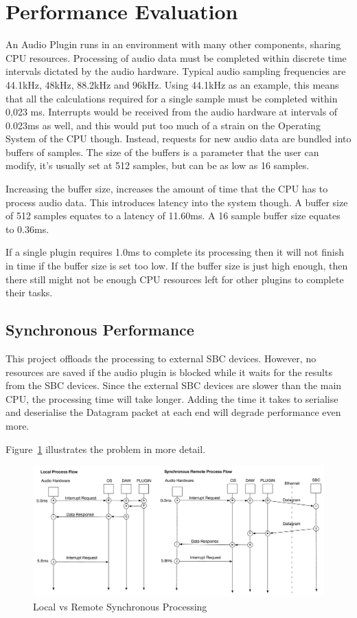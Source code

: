 \section{Performance Evaluation}

An Audio Plugin runs in an environment with many other components, sharing CPU resources. Processing of audio data must be completed within discrete time intervals dictated by the audio hardware. Typical audio sampling frequencies are 44.1kHz, 48kHz, 88.2kHz and 96kHz. Using 44.1kHz as an example, this means that all the calculations required for a single sample must be completed within 0,023 ms. Interrupts would be received from the audio hardware at intervals of 0.023ms as well, and this would put too much of a strain on the Operating System of the CPU though. Instead, requests for new audio data are bundled into buffers of samples. The size of the buffers is a parameter that the user can modify, it's usually set at 512 samples, but can be as low as 16 samples.

Increasing the buffer size, increases the amount of time that the CPU has to process audio data. This introduces latency into the system though. A buffer size of 512 samples equates to a latency of 11.60ms. A 16 sample buffer size equates to 0.36ms.

If a single plugin requires 1.0ms to complete its processing then it will not finish in time if the buffer size is set too low. If the buffer size is just high enough, then there still might not be enough CPU resources left for other plugins to complete their tasks.

\subsection{Synchronous Performance}

This project offloads the processing to external SBC devices. However, no resources are saved if the audio plugin is blocked while it waits for the results from the SBC devices. Since the external SBC devices are slower than the main CPU, the processing time will take longer. Adding the time it takes to serialise and deserialise the Datagram packet at each end will degrade performance even more.

Figure~\ref{fig:local_vs_remote} illustrates the problem in more detail.

\begin{figure}[H]
    \centering
    \includegraphics[width=\textwidth]{assets/conclusion/process_flow_compared.pdf}
    \caption{Local vs Remote Synchronous Processing}
    \label{fig:local_vs_remote}
\end{figure}

